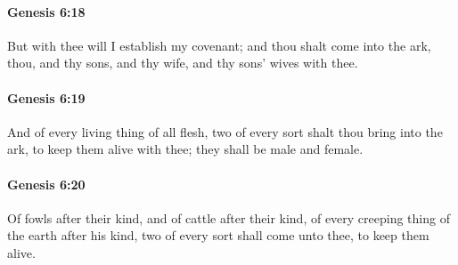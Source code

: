 		\paragraph{Genesis 6:18} %
			\label{GENESIS-6-18}

			But with thee will I establish my covenant; and thou shalt come into the ark, thou, and thy sons, and thy wife, and thy sons' wives with thee.


		\paragraph{Genesis 6:19} %
			\label{GENESIS-6-19}

			And of every living thing of all flesh, two of every sort shalt thou bring into the ark, to keep them alive with thee; they shall be male and female.


		\paragraph{Genesis 6:20} %
			\label{GENESIS-6-20}

			Of fowls after their kind, and of cattle after their kind, of every creeping thing of the earth after his kind, two of every sort shall come unto thee, to keep them alive.


